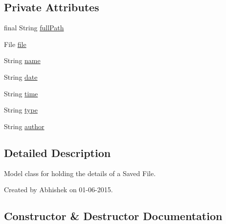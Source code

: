\subsection*{Private Attributes}
\begin{DoxyCompactItemize}
\item 
final String \hyperlink{classorg_1_1buildmlearn_1_1toolkit_1_1model_1_1SavedProject_a4693289823d599da19ede1518790df96}{full\+Path}
\item 
File \hyperlink{classorg_1_1buildmlearn_1_1toolkit_1_1model_1_1SavedProject_aecf6d31347ba21b07d34025fb55259c1}{file}
\item 
String \hyperlink{classorg_1_1buildmlearn_1_1toolkit_1_1model_1_1SavedProject_ac94adccdf486dfd98ff2e7e922467a10}{name}
\item 
String \hyperlink{classorg_1_1buildmlearn_1_1toolkit_1_1model_1_1SavedProject_a81205e5f76f19c9a197aa5b536b88a10}{date}
\item 
String \hyperlink{classorg_1_1buildmlearn_1_1toolkit_1_1model_1_1SavedProject_a2ee63cfcb4cedf66e5d46fd02632d88b}{time}
\item 
String \hyperlink{classorg_1_1buildmlearn_1_1toolkit_1_1model_1_1SavedProject_a8c4244d47e13f8ed782485b6ae80a8b8}{type}
\item 
String \hyperlink{classorg_1_1buildmlearn_1_1toolkit_1_1model_1_1SavedProject_a906f1314db905654413dcbd90f25658b}{author}
\end{DoxyCompactItemize}


\subsection{Detailed Description}
Model class for holding the details of a Saved File. 

Created by Abhishek on 01-\/06-\/2015. 

\subsection{Constructor \& Destructor Documentation}
